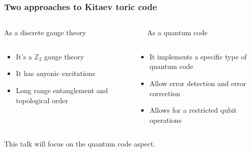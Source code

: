 \documentclass{beamer}
\renewcommand{\(}{\left(}
\renewcommand{\)}{\right)}
\renewcommand{\[}{\left[}
\renewcommand{\]}{\right]}
\begin{document}
\begin{frame}
    \frametitle{Two approaches to Kitaev toric code \citep{Kitaev_2003}}

    \begin{columns}
        \begin{column}{0.5\textwidth}
            \begin{center}
            As a discrete gauge theory
            \end{center}
        \end{column}
        \begin{column}{0.5\textwidth}
            \begin{center}
            As a quantum code
            \end{center}
        \end{column}
    \end{columns}

    \begin{columns}
        \begin{column}{0.5\textwidth}
            \begin{itemize}
                \item It's a $\mathbb{Z}_2$ gauge theory
                \item It has anyonic excitations
                \item Long range entanglement and topological order
            \end{itemize}
        \end{column}
        \begin{column}{0.5\textwidth}
            \begin{itemize}
                \item It implements a specific type of quantum code
                \item Allow error detection and error correction
                \item Allows for a restricted qubit operations
            \end{itemize}
        \end{column}
    \end{columns}
    \vspace{10pt}
    
    \begin{center}
        \begin{framed}
            This talk will focus on the quantum code aspect. 
            \end{framed}
    \end{center}
\end{frame}
\end{document}
